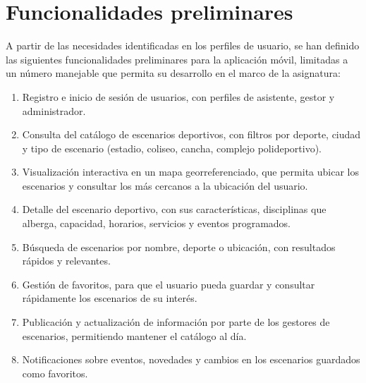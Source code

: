 
\section{Funcionalidades preliminares}

A partir de las necesidades identificadas en los perfiles de usuario, se han
definido las siguientes funcionalidades preliminares para la aplicaci\'on
m\'ovil, limitadas a un n\'umero manejable que permita su desarrollo en el marco
de la asignatura:

\begin{enumerate}
  \item Registro e inicio de sesi\'on de usuarios, con perfiles de
    asistente, gestor y administrador.

  \item Consulta del cat\'alogo de escenarios deportivos, con filtros
    por deporte, ciudad y tipo de escenario (estadio, coliseo, cancha,
    complejo polideportivo).

  \item Visualizaci\'on interactiva en un mapa georreferenciado, que
    permita ubicar los escenarios y consultar los m\'as cercanos a la
    ubicaci\'on del usuario.

  \item Detalle del escenario deportivo, con sus caracter\'isticas,
    disciplinas que alberga, capacidad, horarios, servicios y eventos
    programados.

  \item B\'usqueda de escenarios por nombre, deporte o ubicaci\'on, con
    resultados r\'apidos y relevantes.

  \item Gesti\'on de favoritos, para que el usuario pueda guardar y
    consultar r\'apidamente los escenarios de su inter\'es.

  \item Publicaci\'on y actualizaci\'on de informaci\'on por parte de los
    gestores de escenarios, permitiendo mantener el cat\'alogo al d\'ia.

  \item Notificaciones sobre eventos, novedades y cambios en los
    escenarios guardados como favoritos.
\end{enumerate}
